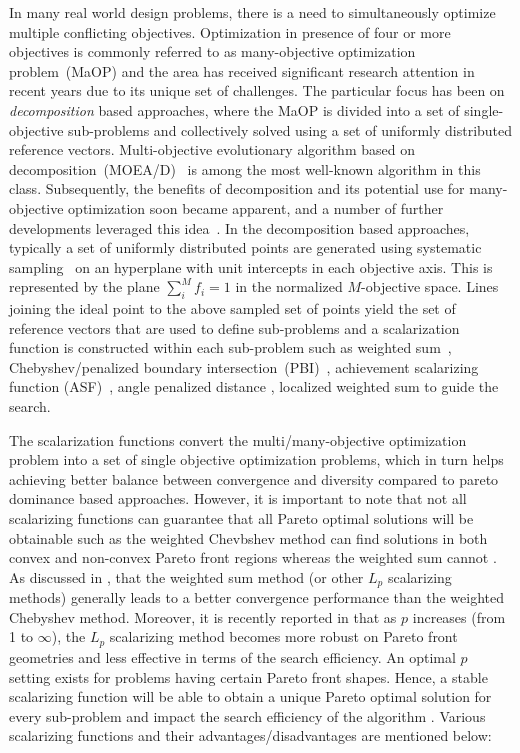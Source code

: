 \documentclass{sig-alternate}
\begin{document}
In many real world design problems, there is a need to simultaneously optimize multiple conflicting objectives. Optimization in presence of four or more objectives is commonly referred to as many-objective optimization problem~(MaOP) and the area has received significant research attention in recent years due to its unique set of challenges. The particular focus has been on \emph{decomposition} based approaches, where the MaOP is divided into a set of single-objective sub-problems and collectively solved using a set of uniformly distributed reference vectors. Multi-objective evolutionary algorithm based on decomposition~(MOEA/D)~\cite{zhang2007moead} is among the most well-known algorithm in this class. Subsequently, the benefits of decomposition and its potential use for many-objective optimization soon became apparent, and a number of further developments leveraged this idea~\cite{trivedisurvey}. In the decomposition based approaches, typically a set of uniformly distributed points are generated using systematic sampling~\cite{das1998normal} on an hyperplane with unit intercepts in each objective axis. This is represented by the plane $\sum^{M}_i{f_i}=1$ in the normalized $M$-objective space. Lines joining the ideal point to the above sampled set of points yield the set of reference vectors that are used to define sub-problems and a scalarization function is constructed within each sub-problem such as weighted sum~\cite{miettinen2012nonlinear, Voss2008}, Chebyshev/penalized boundary intersection~(PBI)~\cite{zhang2007moead}, achievement scalarizing function (ASF)~\cite{miettinen2012nonlinear, Yuan2016many}, angle penalized distance \cite{Cheng2016many}, localized weighted sum \cite{Wang2016ls} to guide the search.

The scalarization functions convert the multi/many-objective optimization problem into a set of single objective optimization problems, which in turn helps achieving better balance between convergence and diversity compared to pareto dominance based approaches. However, it is important to note that not all scalarizing functions can guarantee that all Pareto optimal solutions will be obtainable such as the weighted Chevbshev method can find solutions in both convex and non-convex Pareto front regions whereas the weighted sum cannot \cite{miettinen2012nonlinear}. As discussed in \cite{ishibuchi2009adaptation}, that the weighted sum method (or other $L_p$ scalarizing methods) generally leads to a better convergence performance than the weighted Chebyshev method. Moreover, it is recently reported in \cite{Wang2016dec} that as $p$ increases (from 1 to $\infty$), the $L_p$ scalarizing method becomes more robust on Pareto front geometries and less effective in terms of the search efficiency. An optimal $p$ setting exists for problems having certain Pareto front shapes. Hence, a stable scalarizing function will be able to obtain a unique Pareto optimal solution for every sub-problem \cite{giakiozis2015} and impact the search efficiency of the algorithm \cite{Wang2016ls}. Various scalarizing functions and their advantages/disadvantages are mentioned below: 
\end{document}
